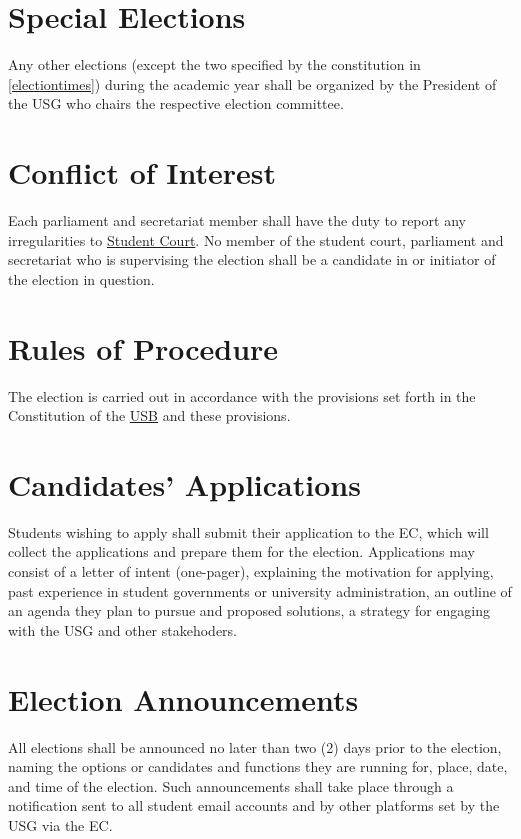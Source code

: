 \documentclass[12pt]{LaTeX_Misc/constitution}
\begin{document}
\section{Special Elections} 
Any other elections (except the two specified by the constitution in \ref{electiontimes}) during the academic year shall be organized by the President of the USG who chairs the respective election committee.

\section{Conflict of Interest}
Each parliament and secretariat member shall have the duty to report any irregularities to \hyperref[StudentCourtDef]{Student Court}. No member of the student court, parliament and secretariat who is supervising the election shall be a candidate in or initiator of the election in question.

\section{Rules of Procedure} 
The election is carried out in accordance with the provisions set forth in the Constitution of the \hyperref[studentbody]{USB} and these provisions.

\section{Candidates' Applications}
Students wishing to apply shall submit their application to the EC, which will collect the applications and prepare them for the election. Applications may consist of a letter of intent (one-pager), explaining the motivation for applying, past experience in student governments or university administration, an outline of an agenda they plan to pursue and proposed solutions, a strategy for engaging with the USG and other stakehoders.


\section{Election Announcements} 
All elections shall be announced no later than two (2) days prior to the election, naming the options or candidates and functions they are running for, place, date, and time of the election. Such announcements shall take place through a notification sent to all student email accounts and by other platforms set by the USG via the EC.
\end{document}
